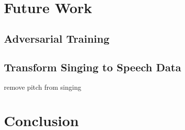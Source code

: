 \documentclass[letterpaper, 12pt]{article}
\begin{document}
\begin{multicols*}{2}
\section{Future Work}
\subsection{Adversarial Training}
\subsection{Transform Singing to Speech Data}
remove pitch from singing


\section{Conclusion}

% 
% 
\printbibliography
\end{multicols*}
\end{document}
